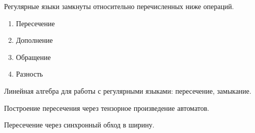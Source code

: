 \begin{theorem}
    Регулярные языки замкнуты относительно перечисленных ниже операций.
    \begin{enumerate}
        \item Пересечение
        \item Дополнение
        \item Обращение
        \item Разность
    \end{enumerate}
\end{theorem}

Линейная алгебра для работы с регулярными языками: пересечение, замыкание.

Построение пересечения через тензорное произведение автоматов.

Пересечение через синхронный обход в ширину.

%
%
